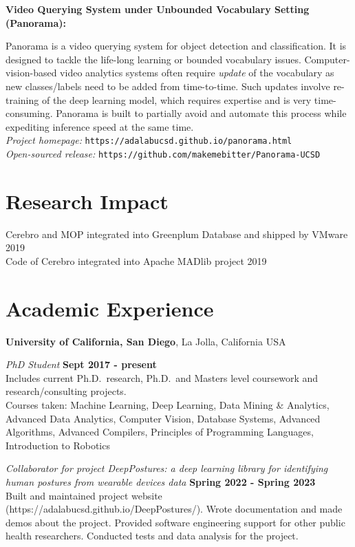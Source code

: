 \documentclass[margin,line]{res}
\begin{document}
\begin{resume}
{\bf Video Querying System under Unbounded Vocabulary Setting (Panorama):}

Panorama is a video querying system for object detection and classification. It is designed to tackle the life-long learning or bounded vocabulary issues. Computer-vision-based video analytics systems often require \textit{update} of the vocabulary as new classes/labels need to be added from time-to-time. Such updates involve re-training of the deep learning model, which requires expertise and is very time-consuming. Panorama is built to partially avoid and automate this process while expediting inference speed at the same time.\\
\textit{Project homepage: }\texttt{https://adalabucsd.github.io/panorama.html}\\
\textit{Open-sourced release: }\texttt{https://github.com/makemebitter/Panorama-UCSD}

\section{\sc Research Impact}
Cerebro and MOP integrated into Greenplum Database and shipped by VMware \hfill 2019\\
Code of Cerebro integrated into Apache MADlib project \hfill 2019\\

\section{\sc Academic Experience}
{\bf University of California, San Diego}, La Jolla, California USA

\vspace{-.3cm}
{\em PhD Student} \hfill {\bf Sept 2017 - present}\\
Includes current Ph.D.~research, Ph.D.~and Masters level coursework and
research/consulting projects.\\
Courses taken: Machine Learning, Deep Learning, Data Mining \& Analytics, Advanced Data Analytics, Computer Vision, Database Systems, Advanced Algorithms, Advanced Compilers, Principles of Programming Languages, Introduction to Robotics

{\em Collaborator for project DeepPostures: a deep learning library for identifying human postures from wearable devices data} \hfill {\bf Spring 2022 - Spring 2023}\\
Built and maintained project website (https://adalabucsd.github.io/DeepPostures/). Wrote documentation and made demos about the project. Provided software engineering support for other public health researchers. Conducted tests and data analysis for the project. 


\end{resume}
\end{document}
